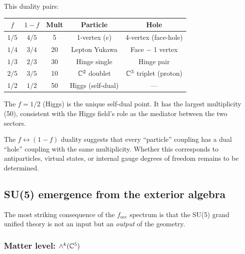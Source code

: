 This duality pairs:
\begin{center}
\begin{tabular}{ccccc}
\hline
$f$ & $1-f$ & Mult & Particle & Hole \\
\hline
$1/5$ & $4/5$ & 5 & 1-vertex ($e$) & 4-vertex (face-hole) \\
$1/4$ & $3/4$ & 20 & Lepton Yukawa & Face $-$ 1 vertex \\
$1/3$ & $2/3$ & 30 & Hinge single & Hinge pair \\
$2/5$ & $3/5$ & 10 & $\mathbb{C}^2$ doublet & $\mathbb{C}^3$ triplet (proton) \\
$1/2$ & $1/2$ & 50 & Higgs (self-dual) & --- \\
\hline
\end{tabular}
\end{center}

The $f = 1/2$ (Higgs) is the unique self-dual point.  It has the largest multiplicity (50), consistent with the Higgs field's role as the mediator between the two sectors.

\begin{remark}
The $f \leftrightarrow (1-f)$ duality suggests that every ``particle'' coupling has a dual ``hole'' coupling with the same multiplicity.  Whether this corresponds to antiparticles, virtual states, or internal gauge degrees of freedom remains to be determined.
\end{remark}

\subsection{SU(5) emergence from the exterior algebra}
\label{sec:su5_emergence}

The most striking consequence of the $f_\mathrm{occ}$ spectrum is that the SU(5) grand unified theory is not an input but an \emph{output} of the geometry.

\subsubsection{Matter level: $\wedge^k(\mathbb{C}^5)$}

